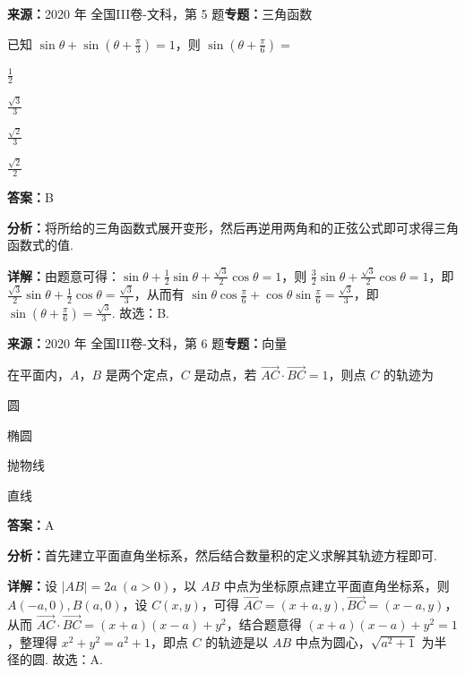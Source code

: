 \begin{question}[points=5]
\textbf{来源：}2020 年 全国III卷-文科，第 5 题\quad \textbf{专题：}三角函数\par
已知 $\sin\theta+\sin(\theta+\frac{\pi}{3})=1$，则 $\sin(\theta+\frac{\pi}{6})=$
\begin{choices}
  \item $\frac{1}{2}$
  \item $\frac{\sqrt{3}}{3}$
  \item $\frac{\sqrt{2}}{3}$
  \item $\frac{\sqrt{2}}{2}$
\end{choices}
\begin{solution}
\textbf{答案：}B

\textbf{分析：}将所给的三角函数式展开变形，然后再逆用两角和的正弦公式即可求得三角函数式的值.

\textbf{详解：}由题意可得：$\sin\theta+\frac{1}{2}\sin\theta+\frac{\sqrt{3}}{2}\cos\theta=1$，则 $\frac{3}{2}\sin\theta+\frac{\sqrt{3}}{2}\cos\theta=1$，即 $\frac{\sqrt{3}}{2}\sin\theta+\frac{1}{2}\cos\theta=\frac{\sqrt{3}}{3}$，从而有 $\sin\theta\cos\frac{\pi}{6}+\cos\theta\sin\frac{\pi}{6}=\frac{\sqrt{3}}{3}$，即 $\sin(\theta+\frac{\pi}{6})=\frac{\sqrt{3}}{3}$. 故选：B.
\end{solution}
\end{question}

\begin{question}[points=5]
\textbf{来源：}2020 年 全国III卷-文科，第 6 题\quad \textbf{专题：}向量\par
在平面内，$A$，$B$ 是两个定点，$C$ 是动点，若 $\overrightarrow{AC}\cdot\overrightarrow{BC}=1$，则点 $C$ 的轨迹为
\begin{choices}
  \item 圆
  \item 椭圆
  \item 抛物线
  \item 直线
\end{choices}
\begin{solution}
\textbf{答案：}A

\textbf{分析：}首先建立平面直角坐标系，然后结合数量积的定义求解其轨迹方程即可.

\textbf{详解：}设 $|AB|=2a\ (a>0)$，以 $AB$ 中点为坐标原点建立平面直角坐标系，则 $A(-a,0),B(a,0)$，设 $C(x,y)$，可得 $\overrightarrow{AC}=(x+a,y),\overrightarrow{BC}=(x-a,y)$，从而 $\overrightarrow{AC}\cdot\overrightarrow{BC}=(x+a)(x-a)+y^2$，结合题意得 $(x+a)(x-a)+y^2=1$，整理得 $x^2+y^2=a^2+1$，即点 $C$ 的轨迹是以 $AB$ 中点为圆心，$\sqrt{a^2+1}$ 为半径的圆. 故选：A.
\end{solution}
\end{question}

